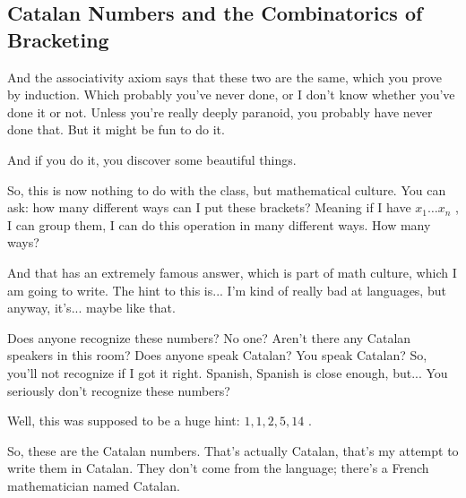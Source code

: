 \subsection{Catalan Numbers and the Combinatorics of Bracketing}

\begin{speech}[00:53:39 - 00:55:39]
And the associativity axiom says that these two are the same, which you prove by induction. Which probably you've never done, or I don't know whether you've done it or not. Unless you're really deeply paranoid, you probably have never done that. But it might be fun to do it.

And if you do it, you discover some beautiful things.

So, this is now nothing to do with the class, but mathematical culture. You can ask: how many different ways can I put these brackets?  Meaning if I have $x_1 \dots x_n$ , I can group them, I can do this operation in many different ways. How many ways?

And that has an extremely famous answer, which is part of math culture, which I am going to write. The hint to this is... I'm kind of really bad at languages, but anyway, it's...  maybe like that.

Does anyone recognize these numbers?
No one?
Aren't there any Catalan speakers in this room? Does anyone speak Catalan?
You speak Catalan? So, you'll not recognize if I got it right.
Spanish, Spanish is close enough, but...
You seriously don't recognize these numbers?

Well, this was supposed to be a huge hint: $1, 1, 2, 5, 14$ .

So, these are the Catalan numbers. That's actually Catalan, that's my attempt to write them in Catalan. They don't come from the language; there's a French mathematician named Catalan.
\end{speech}

